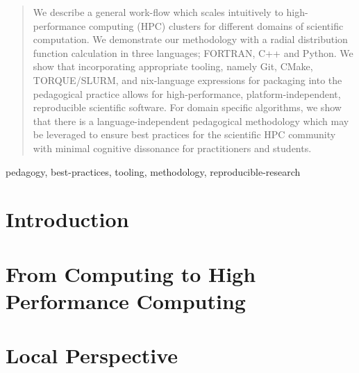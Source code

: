 \documentclass[conference]{IEEEtran}
\begin{document}
\maketitle

\begin{abstract}
	We describe a general work-flow which scales intuitively to high-performance computing (HPC) clusters for different domains of scientific computation. We demonstrate our methodology with a radial distribution function calculation in three languages; FORTRAN, C++ and Python. We show that incorporating appropriate tooling, namely Git, CMake, TORQUE/SLURM, and nix-language expressions for packaging into the pedagogical practice allows for high-performance, platform-independent, reproducible scientific software. For domain specific algorithms, we show that there is a language-independent pedagogical methodology which may be leveraged to ensure best practices for the scientific HPC community with minimal cognitive dissonance for practitioners and students.
\end{abstract}

\begin{IEEEkeywords}
	pedagogy, best-practices, tooling, methodology, reproducible-research
\end{IEEEkeywords}

\section{Introduction}
\section{From Computing to High Performance Computing}
\section{Local Perspective}
\printbibliography
\end{document}
